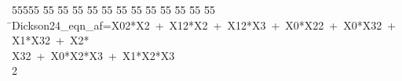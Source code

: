 %
%
\begin{tabbing}
55555 \= 55 \= 55 \= 55 \= 55 \= 55 \= 55 \= 55 \= 55 \= 55 \= 55 \= 55 \= 55 \= \>Dickson24\_eqn\_af=X02*X2\ +\ X12*X2\ +\ X12*X3\ +\ X0*X22\ +\ X0*X32\ +\ X1*X32\ +\ X2*\\[0pt]
\>X32\ +\ X0*X2*X3\ +\ X1*X2*X3\\[0pt]
2\>\end{tabbing}
